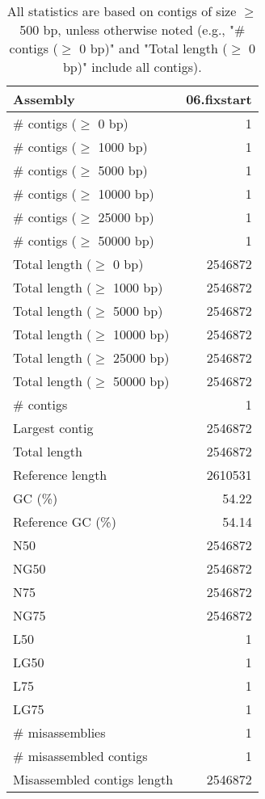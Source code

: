 \documentclass[12pt,a4paper]{article}
\begin{document}
\begin{table}[ht]
\begin{center}
\caption{All statistics are based on contigs of size $\geq$ 500 bp, unless otherwise noted (e.g., "\# contigs ($\geq$ 0 bp)" and "Total length ($\geq$ 0 bp)" include all contigs).}
\begin{tabular}{|l*{1}{|r}|}
\hline
Assembly & 06.fixstart \\ \hline
\# contigs ($\geq$ 0 bp) & 1 \\ \hline
\# contigs ($\geq$ 1000 bp) & 1 \\ \hline
\# contigs ($\geq$ 5000 bp) & 1 \\ \hline
\# contigs ($\geq$ 10000 bp) & 1 \\ \hline
\# contigs ($\geq$ 25000 bp) & 1 \\ \hline
\# contigs ($\geq$ 50000 bp) & 1 \\ \hline
Total length ($\geq$ 0 bp) & 2546872 \\ \hline
Total length ($\geq$ 1000 bp) & 2546872 \\ \hline
Total length ($\geq$ 5000 bp) & 2546872 \\ \hline
Total length ($\geq$ 10000 bp) & 2546872 \\ \hline
Total length ($\geq$ 25000 bp) & 2546872 \\ \hline
Total length ($\geq$ 50000 bp) & 2546872 \\ \hline
\# contigs & 1 \\ \hline
Largest contig & 2546872 \\ \hline
Total length & 2546872 \\ \hline
Reference length & 2610531 \\ \hline
GC (\%) & 54.22 \\ \hline
Reference GC (\%) & 54.14 \\ \hline
N50 & 2546872 \\ \hline
NG50 & 2546872 \\ \hline
N75 & 2546872 \\ \hline
NG75 & 2546872 \\ \hline
L50 & 1 \\ \hline
LG50 & 1 \\ \hline
L75 & 1 \\ \hline
LG75 & 1 \\ \hline
\# misassemblies & 1 \\ \hline
\# misassembled contigs & 1 \\ \hline
Misassembled contigs length & 2546872 \\ \hline

\end{tabular}
\end{center}
\end{table}
\end{document}

